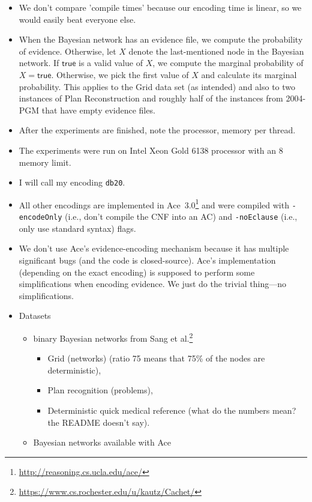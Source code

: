 \documentclass{article}
\theoremstyle{definition}
\theoremstyle{remark}
\begin{document}
\begin{itemize}
\item We don't compare 'compile times' because our encoding time is linear, so
  we would easily beat everyone else.
\item When the Bayesian network has an evidence file, we compute the probability
  of evidence. Otherwise, let $X$ denote the last-mentioned node in the Bayesian
  network. If $\mathsf{true}$ is a valid value of $X$, we compute the marginal
  probability of $X = \mathsf{true}$. Otherwise, we pick the first value of $X$
  and calculate its marginal probability. This applies to the Grid data set (as
  intended) and also to two instances of Plan Reconstruction and roughly half of
  the instances from 2004-PGM that have empty evidence files.
\item After the experiments are finished, note the processor, memory per thread.
\item The experiments were run on Intel Xeon Gold 6138 processor with an
  \SI{8}{\giga\byte} memory limit.
\item I will call my encoding \texttt{db20}.
\item All other encodings are implemented in
  Ace~3.0\footnote{\url{http://reasoning.cs.ucla.edu/ace/}} and were compiled
  with \texttt{-encodeOnly} (i.e., don't compile the CNF into an AC) and
  \texttt{-noEclause} (i.e., only use standard syntax) flags.
\item We don't use Ace's evidence-encoding mechanism because it has multiple
  significant bugs (and the code is closed-source). Ace's implementation
  (depending on the exact encoding) is supposed to perform some simplifications
  when encoding evidence. We just do the trivial thing---no simplifications.
\item Datasets
  \begin{itemize}
  \item binary Bayesian networks from Sang et
    al.\footnote{\url{https://www.cs.rochester.edu/u/kautz/Cachet/}}
    \cite{DBLP:conf/aaai/SangBK05}
    \begin{itemize}
    \item Grid (networks) (ratio 75 means that 75\% of the nodes are
      deterministic),
    \item Plan recognition (problems),
    \item Deterministic quick medical reference (what do the numbers mean? the
      README doesn't say).
    \end{itemize}
  \item Bayesian networks available with Ace

\end{itemize}
\end{itemize}
\end{document}
